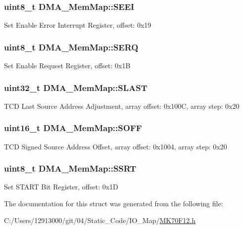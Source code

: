 \subsubsection[{S\+E\+E\+I}]{\setlength{\rightskip}{0pt plus 5cm}uint8\+\_\+t D\+M\+A\+\_\+\+Mem\+Map\+::\+S\+E\+E\+I}\label{struct_d_m_a___mem_map_a576075e4d10859c84e48e7abc1e030aa}
Set Enable Error Interrupt Register, offset\+: 0x19 \hypertarget{struct_d_m_a___mem_map_ac6934aad6952b966b2d0bed0e5d4d58c}{}
\subsubsection[{S\+E\+R\+Q}]{\setlength{\rightskip}{0pt plus 5cm}uint8\+\_\+t D\+M\+A\+\_\+\+Mem\+Map\+::\+S\+E\+R\+Q}\label{struct_d_m_a___mem_map_ac6934aad6952b966b2d0bed0e5d4d58c}
Set Enable Request Register, offset\+: 0x1\+B \hypertarget{struct_d_m_a___mem_map_a2642aa56631c9a8c9b83ca244f8ce0dd}{}
\subsubsection[{S\+L\+A\+S\+T}]{\setlength{\rightskip}{0pt plus 5cm}uint32\+\_\+t D\+M\+A\+\_\+\+Mem\+Map\+::\+S\+L\+A\+S\+T}\label{struct_d_m_a___mem_map_a2642aa56631c9a8c9b83ca244f8ce0dd}
T\+C\+D Last Source Address Adjustment, array offset\+: 0x100\+C, array step\+: 0x20 \hypertarget{struct_d_m_a___mem_map_abbbb3ec6364c286b7db38b8eefb64250}{}
\subsubsection[{S\+O\+F\+F}]{\setlength{\rightskip}{0pt plus 5cm}uint16\+\_\+t D\+M\+A\+\_\+\+Mem\+Map\+::\+S\+O\+F\+F}\label{struct_d_m_a___mem_map_abbbb3ec6364c286b7db38b8eefb64250}
T\+C\+D Signed Source Address Offset, array offset\+: 0x1004, array step\+: 0x20 \hypertarget{struct_d_m_a___mem_map_a39ea12b8e20431f54f8c6ba9f08bfc1b}{}
\subsubsection[{S\+S\+R\+T}]{\setlength{\rightskip}{0pt plus 5cm}uint8\+\_\+t D\+M\+A\+\_\+\+Mem\+Map\+::\+S\+S\+R\+T}\label{struct_d_m_a___mem_map_a39ea12b8e20431f54f8c6ba9f08bfc1b}
Set S\+T\+A\+R\+T Bit Register, offset\+: 0x1\+D 

The documentation for this struct was generated from the following file\+:\begin{DoxyCompactItemize}
\item 
C\+:/\+Users/12913000/git/04/\+Static\+\_\+\+Code/\+I\+O\+\_\+\+Map/\hyperlink{_m_k70_f12_8h}{M\+K70\+F12.\+h}\end{DoxyCompactItemize}
